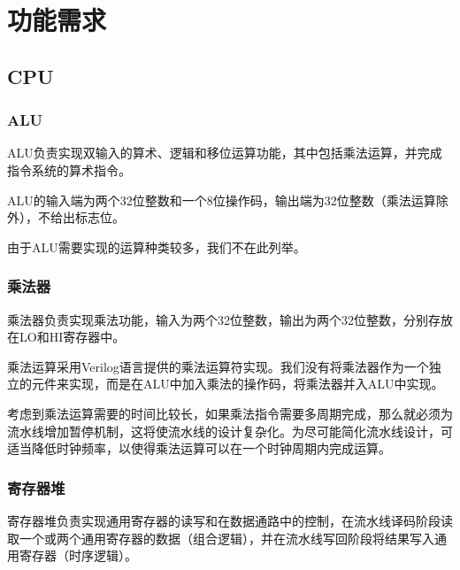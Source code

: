 \section{功能需求}
\subsection{CPU}
\subsubsection{ALU}
ALU负责实现双输入的算术、逻辑和移位运算功能，其中包括乘法运算，并完成指令系统的算术指令。

ALU的输入端为两个32位整数和一个8位操作码，输出端为32位整数（乘法运算除外），不给出标志位。

由于ALU需要实现的运算种类较多，我们不在此列举。


\subsubsection{乘法器}
乘法器负责实现乘法功能，输入为两个32位整数，输出为两个32位整数，分别存放在LO和HI寄存器中。

乘法运算采用Verilog语言提供的乘法运算符实现。我们没有将乘法器作为一个独立的元件来实现，而是在ALU中加入乘法的操作码，将乘法器并入ALU中实现。

考虑到乘法运算需要的时间比较长，如果乘法指令需要多周期完成，那么就必须为流水线增加暂停机制，这将使流水线的设计复杂化。为尽可能简化流水线设计，可适当降低时钟频率，以使得乘法运算可以在一个时钟周期内完成运算。

\subsubsection{寄存器堆}
寄存器堆负责实现通用寄存器的读写和在数据通路中的控制，在流水线译码阶段读取一个或两个通用寄存器的数据（组合逻辑），并在流水线写回阶段将结果写入通用寄存器（时序逻辑）。

